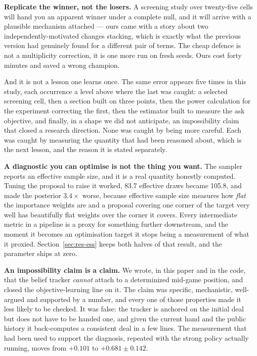 \documentclass[11pt,letterpaper]{article}
\begin{document}
\textbf{Replicate the winner, not the losers.} A screening study over
twenty-five cells will hand you an apparent winner under a complete null, and it
will arrive with a plausible mechanism attached --- ours came with a story about
two independently-motivated changes stacking, which is exactly what the previous
version had genuinely found for a different pair of terms. The cheap defence is
not a multiplicity correction, it is one more run on fresh seeds. Ours cost forty
minutes and saved a wrong champion.

And it is not a lesson one learns once. The same error appears five times in this
study, each occurrence a level above where the last was caught: a selected
screening cell, then a section built on three points, then the power calculation
for the experiment correcting the first, then the estimator built to measure the
ask objective, and finally, in a shape we did not anticipate, an
impossibility claim that closed a research direction. None was caught by being
more careful. Each was caught by measuring the quantity that had been reasoned
about, which is the next lesson, and the reason it is stated separately.

\textbf{A diagnostic you can optimise is not the thing you want.} The sampler
reports an effective sample size, and it is a real quantity honestly computed.
Tuning the proposal to raise it worked, 83.7 effective draws became 105.8,
and made the posterior $3.4\times$ worse, because effective sample size measures
how \emph{flat} the importance weights are and a proposal covering one corner of
the target very well has beautifully flat weights over the corner it covers.
Every intermediate metric in a pipeline is a proxy for something further
downstream, and the moment it becomes an optimisation target it stops being a
measurement of what it proxied. Section~\ref{sec:res-ess} keeps both halves of
that result, and the parameter ships at zero.

\textbf{An impossibility claim is a claim.} We wrote, in this paper and in the
code, that the belief tracker \emph{cannot} attach to a determinized mid-game
position, and closed the objective-learning line on it. The claim was specific,
mechanistic, well-argued and supported by a number, and every one of those
properties made it less likely to be checked. It was false: the tracker is
anchored on the initial deal but does not have to be handed one, and given the
current hand and the public history it back-computes a consistent deal in a few
lines. The measurement that had been used to support the diagnosis, repeated
with the strong policy actually running, moves from $+0.101$ to
$+0.681 \pm 0.142$.
\end{document}
